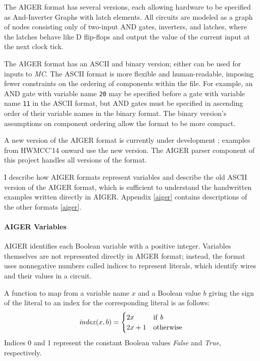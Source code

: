 \documentclass[12pt,a4paper,twoside,openright]{report}
\begin{document}
{The AIGER format has several versions, each allowing hardware to be
specified as
And-Inverter Graphs with latch elements.
All circuits are modeled as a graph of nodes consisting only of
two-input AND gates, inverters, and latches, where the latches behave like D
flip-flops and output the value of the current input at the next
clock tick.

The AIGER format has an ASCII and binary version; either
can be used for inputs to \emph{MC}. The ASCII
format is more flexible and human-readable, imposing fewer constraints
on the ordering of components within the file. For example, an
AND gate with variable name {\tt 20} may be specified before a gate with
variable name {\tt 11} in the ASCII format, but AND gates must be specified in
ascending order of their variable names in the binary format.
The binary version's assumptions on component ordering allow the format
to be more compact.

A new version of the AIGER format is currently under development \cite{aiger};
examples from HWMCC'14 onward use the new version. The AIGER parser component
of this project handles all versions of the format.

I describe how AIGER formats represent variables
and describe the old ASCII version of the AIGER format, which
is sufficient to understand the handwritten examples written directly
in AIGER. Appendix \ref{aiger} contains descriptions of the other formats
\ref{aiger}.

\paragraph{AIGER Variables}{
AIGER identifies each Boolean variable with a positive integer.
Variables themselves are not represented directly in AIGER format; instead, the
format uses nonnegative numbers called indices to represent literals,
which identify wires and their values in a circuit.

A function to map from a variable name $x$ and a Boolean
value $b$ giving the sign of the literal to an index for
the corresponding literal is as follows:
$${\it index}(x, b) =
\begin{cases}
2x & {\rm if}~b \\
2x + 1 & {\rm otherwise}
\end{cases}$$
Indices 0 and 1 represent the constant Boolean values {\it False}
and {\it True}, respectively.

}}
\end{document}
